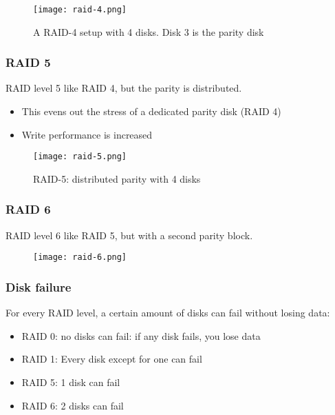 \documentclass{article}
\begin{document}
\begin{figure}[H]
    \centering
    \texttt{[image: raid-4.png]}
    \caption{A RAID-4 setup with 4 disks. Disk 3 is the parity disk}
\end{figure}


\subsubsection{RAID 5}

RAID level 5 like RAID 4, but the parity is distributed.

\begin{itemize}
    \item This evens out the stress of a dedicated parity disk (RAID 4)
    \item Write performance is increased
\end{itemize}

\begin{figure}[H]
    \centering
    \texttt{[image: raid-5.png]}
    \caption{RAID-5: distributed parity with 4 disks}
\end{figure}


\subsubsection{RAID 6}

RAID level 6 like RAID 5, but with a second parity block.

\begin{figure}[H]
    \centering
    \texttt{[image: raid-6.png]}
\end{figure}



\subsubsection{Disk failure}

For every RAID level, a certain amount of disks can fail without losing data:

\begin{itemize}
    \item RAID 0: no disks can fail: if any disk fails, you lose data
    \item RAID 1: Every disk except for one can fail
    \item RAID 5: 1 disk can fail
    \item RAID 6: 2 disks can fail
\end{itemize}
\end{document}
